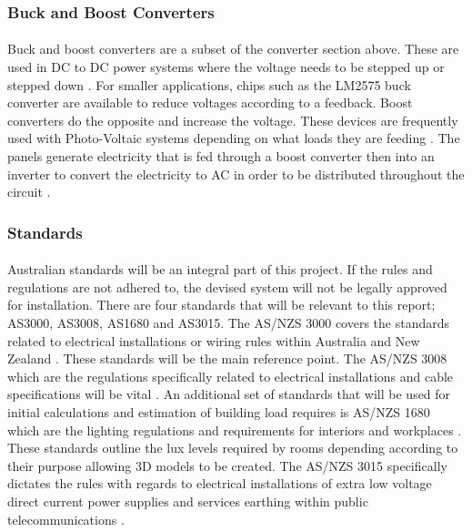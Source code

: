 \subsubsection{Buck and Boost Converters}

\paragraph{}
Buck and boost converters are a subset of the converter section above. These are used in DC to DC power systems where the voltage needs to be stepped up or stepped down \cite{textbook:Abu-Rub2014}. For smaller applications, chips such as the LM2575 buck converter are available to reduce voltages according to a feedback. Boost converters do the opposite and increase the voltage. These devices are frequently used with Photo-Voltaic systems depending on what loads they are feeding \cite{textbook:Abu-Rub2014}. The panels generate electricity that is fed through a boost converter then into an inverter to convert the electricity to AC in order to be distributed throughout the circuit \cite{textbook:Abu-Rub2014}.     


\subsubsection{Standards}

\paragraph{}
Australian standards will be an integral part of this project. If the rules and regulations are not adhered to, the devised system will not be legally approved for installation. There are four standards that will be relevant to this report; AS3000, AS3008, AS1680 and AS3015. The AS/NZS 3000 covers the standards related to electrical installations or wiring rules within Australia and New Zealand \cite{StandardsAustralia2007}. These standards will be the main reference point. The AS/NZS 3008 which are the regulations specifically related to electrical installations and cable specifications will be vital \cite{StandardsAustralia2010}. An additional set of standards that will be used for initial calculations and estimation of building load requires is AS/NZS 1680 which are the lighting regulations and requirements for interiors and workplaces \cite{StandardsAustralia2006_2}. These standards outline the lux levels required by rooms depending according to their purpose allowing 3D models to be created. The AS/NZS 3015 specifically dictates the rules with regards to electrical installations of extra low voltage direct current power supplies and services earthing within public telecommunications \cite{StandardsAustralia2004}.     

